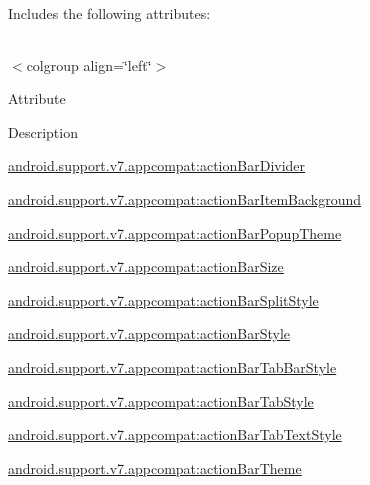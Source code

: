 Includes the following attributes\+:

\tabulinesep=1mm
\begin{longtabu} spread 0pt [c]{*{0}{|X[-1]}|}
\hline
\end{longtabu}
$<$colgroup align=\char`\"{}left\char`\"{}$>$ 

Attribute

Description 

{\ttfamily \hyperlink{classandroid_1_1support_1_1v7_1_1appcompat_1_1R_1_1styleable_a2d926b280f2f1a0f939bb5cf4a225345}{android.\+support.\+v7.\+appcompat\+:action\+Bar\+Divider}}

{\ttfamily \hyperlink{classandroid_1_1support_1_1v7_1_1appcompat_1_1R_1_1styleable_a17eecf1a80d73bd2a653d3d4b0c370d3}{android.\+support.\+v7.\+appcompat\+:action\+Bar\+Item\+Background}}

{\ttfamily \hyperlink{classandroid_1_1support_1_1v7_1_1appcompat_1_1R_1_1styleable_ad1da7806009a3e57f92cf88e4c8ac44a}{android.\+support.\+v7.\+appcompat\+:action\+Bar\+Popup\+Theme}}

{\ttfamily \hyperlink{classandroid_1_1support_1_1v7_1_1appcompat_1_1R_1_1styleable_a52ac1f860eda81cb2958b695309ae510}{android.\+support.\+v7.\+appcompat\+:action\+Bar\+Size}}

{\ttfamily \hyperlink{classandroid_1_1support_1_1v7_1_1appcompat_1_1R_1_1styleable_ad74d0d401e28273f585ebe1accd70505}{android.\+support.\+v7.\+appcompat\+:action\+Bar\+Split\+Style}}

{\ttfamily \hyperlink{classandroid_1_1support_1_1v7_1_1appcompat_1_1R_1_1styleable_aff968b1e543d42c65c91979ff78e7eb9}{android.\+support.\+v7.\+appcompat\+:action\+Bar\+Style}}

{\ttfamily \hyperlink{classandroid_1_1support_1_1v7_1_1appcompat_1_1R_1_1styleable_ac89b799df31756d7b6caae2096111d8c}{android.\+support.\+v7.\+appcompat\+:action\+Bar\+Tab\+Bar\+Style}}

{\ttfamily \hyperlink{classandroid_1_1support_1_1v7_1_1appcompat_1_1R_1_1styleable_a2c4b1233d1cce4f6c18fc9982808d74f}{android.\+support.\+v7.\+appcompat\+:action\+Bar\+Tab\+Style}}

{\ttfamily \hyperlink{classandroid_1_1support_1_1v7_1_1appcompat_1_1R_1_1styleable_a82190f5955d5a7de45c6d9213d167e18}{android.\+support.\+v7.\+appcompat\+:action\+Bar\+Tab\+Text\+Style}}

{\ttfamily \hyperlink{classandroid_1_1support_1_1v7_1_1appcompat_1_1R_1_1styleable_ad2fa65ea8877e20263573e6421d9984a}{android.\+support.\+v7.\+appcompat\+:action\+Bar\+Theme}}

